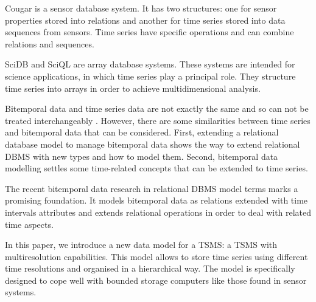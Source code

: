 Cougar \cite{bonnet01} is a sensor database system. It has two
structures: one for sensor properties stored into relations and
another for time series stored into data sequences from sensors.  Time
series have specific operations and can combine relations and
sequences. %

SciDB \cite{stonebraker09:scidb} and SciQL \cite{zhang11} are array
database systems. These systems are intended for science applications,
in which time series play a principal role. They structure time series
into arrays in order to achieve multidimensional analysis. %

Bitemporal data and time series data are not exactly the same and so
can not be treated interchangeably \cite{schmidt95}. However, there
are some similarities between time series and bitemporal data that can
be considered. First, extending a relational database model to manage
bitemporal data shows the way to extend relational DBMS with new types
and how to model them. Second, bitemporal data modelling settles some
time-related concepts that can be extended to time series.

The recent bitemporal data research in relational DBMS model terms
\cite{date02:_tempor_data_relat_model} marks a promising
foundation. It models bitemporal data as relations extended with time
intervals attributes and extends relational operations in order to
deal with related time aspects.





In this paper, we introduce a new data model for a TSMS: a TSMS with
multiresolution capabilities. This model allows to store time series
using different time resolutions and organised in a
hierarchical way. The model is specifically designed to cope
well with bounded storage computers like those found in sensor
systems.


